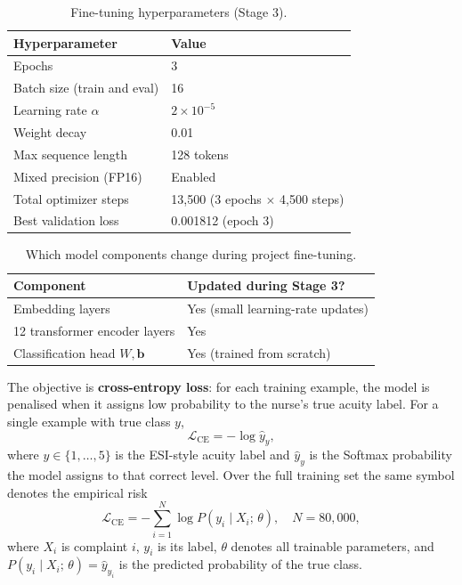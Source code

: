 \begin{table}[H]
\centering
\small
\begin{tabular}{|l|l|}
\hline
\textbf{Hyperparameter} & \textbf{Value} \\
\hline
Epochs & 3 \\
Batch size (train and eval) & 16 \\
Learning rate \(\alpha\) & \(2 \times 10^{-5}\) \\
Weight decay & 0.01 \\
Max sequence length & 128 tokens \\
Mixed precision (FP16) & Enabled \\
Total optimizer steps & 13,500 (3 epochs \(\times\) 4,500 steps) \\
Best validation loss & 0.001812 (epoch 3) \\
\hline
\end{tabular}
\caption{Fine-tuning hyperparameters (Stage 3).}
\label{tab:hyperparams}
\end{table}

\begin{table}[H]
\centering
\small
\begin{tabular}{|l|p{8.5cm}|}
\hline
\textbf{Component} & \textbf{Updated during Stage 3?} \\
\hline
Embedding layers & Yes (small learning-rate updates) \\
12 transformer encoder layers & Yes \\
Classification head \(W, \mathbf{b}\) & Yes (trained from scratch) \\
\hline
\end{tabular}
\caption{Which model components change during project fine-tuning.}
\label{tab:trainable-components}
\end{table}

The objective is \textbf{cross-entropy loss}: for each training example, the model is penalised when it assigns low probability to the nurse's true acuity label. For a single example with true class \(y\),
\begin{equation}
  \mathcal{L}_{\mathrm{CE}} = -\log \hat{y}_{y},
\end{equation}
where \(y \in \{1,\ldots,5\}\) is the ESI-style acuity label and \(\hat{y}_{y}\) is the Softmax probability the model assigns to that correct level. Over the full training set the same symbol denotes the empirical risk
\begin{equation}
  \mathcal{L}_{\mathrm{CE}} = -\sum_{i=1}^{N} \log P(y_i \mid X_i;\, \theta), \quad N = 80{,}000,
\end{equation}
where \(X_i\) is complaint \(i\), \(y_i\) is its label, \(\theta\) denotes all trainable parameters, and \(P(y_i \mid X_i;\, \theta)=\hat{y}_{y_i}\) is the predicted probability of the true class.

